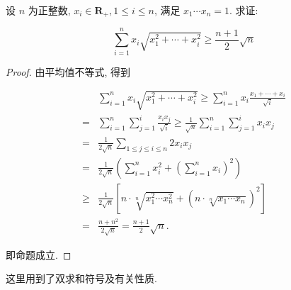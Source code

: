 \begin{example}
	设 $n$ 为正整数, $x_{i} \in \mathbf{R}_{+}, 1 \leqslant i \leqslant n$, 满足 $x_{1} \cdots x_{n}=1$. 求证:
	
	$$
	\sum_{i=1}^{n} x_{i} \sqrt{x_{1}^{2}+\cdots+x_{i}^{2}} \geqslant \frac{n+1}{2} \sqrt{n}
	$$
\end{example}
\begin{proof}
	由平均值不等式, 得到
	
	$$
	\begin{aligned}
	& \sum_{i=1}^{n} x_{i} \sqrt{x_{1}^{2}+\cdots+x_{i}^{2}} \geqslant \sum_{i=1}^{n} x_{i} \frac{x_{1}+\cdots+x_{i}}{\sqrt{i}} \\
	= & \sum_{i=1}^{n} \sum_{j=1}^{i} \frac{x_{i} x_{j}}{\sqrt{i}} \geqslant \frac{1}{\sqrt{n}} \sum_{i=1}^{n} \sum_{j=1}^{i} x_{i} x_{j} \\
	= & \frac{1}{2 \sqrt{n}} \sum_{1 \leqslant j \leqslant i \leqslant n} 2 x_{i} x_{j} \\
	= & \frac{1}{2 \sqrt{n}}\left(\sum_{i=1}^{n} x_{i}^{2}+\left(\sum_{i=1}^{n} x_{i}\right)^{2}\right) \\
	\geqslant & \frac{1}{2 \sqrt{n}}\left[n \cdot \sqrt[n]{x_{1}^{2} \cdots x_{n}^{2}}+\left(n \cdot \sqrt[n]{x_{1} \cdots x_{n}}\right)^{2}\right] \\
	= & \frac{n+n^{2}}{2 \sqrt{n}}=\frac{n+1}{2} \sqrt{n} .
	\end{aligned}
	$$
	
	即命题成立.
\end{proof}
\begin{note}
	这里用到了双求和符号及有关性质.
\end{note}


